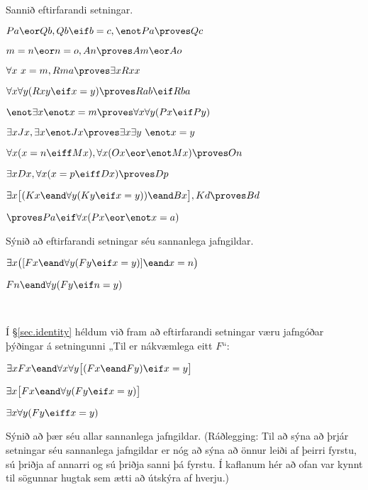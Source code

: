 \practiceproblems
\problempart
\label{pr.identity}
Sannið eftirfarandi setningar.
\begin{earg}
\item $Pa \eor Qb, Qb \eif b=c, \enot Pa \proves Qc$
\item $m=n \eor n=o, An \proves Am \eor Ao$
\item $\forall x\ x=m, Rma\proves \exists x Rxx$
\item $\forall x\forall y(Rxy \eif x=y)\proves Rab \eif Rba$
\item $\enot \exists x\enot x = m \proves \forall x\forall y (Px \eif Py)$
\item $\exists x Jx, \exists x \enot Jx\proves \exists x \exists y\ \enot x = y$
\item $\forall x(x=n \eiff Mx), \forall x(Ox \eor \enot Mx)\proves On$
\item $\exists x Dx, \forall x(x=p \eiff Dx)\proves Dp$
\item $\exists x\bigl[(Kx \eand \forall y(Ky \eif x=y)) \eand Bx\bigr], Kd\proves Bd$
\item $\proves Pa \eif \forall x(Px \eor \enot x = a)$
\end{earg}

\problempart
Sýnið að eftirfarandi setningar séu sannanlega jafngildar.
\begin{ebullet}
\item $\exists x \bigl([Fx \eand \forall y (Fy \eif x = y)] \eand x = n\bigr)$
\item $Fn \eand \forall y (Fy \eif n= y)$
\end{ebullet}

\

\problempart
Í \S\ref{sec.identity} héldum við fram að eftirfarandi setningar væru jafngóðar þýðingar á setningunni „Til er nákvæmlega eitt $F$“:
\begin{ebullet}
\item $\exists x Fx \eand \forall x \forall y \bigl[(Fx \eand Fy) \eif x = y\bigr]$
\item $\exists x \bigl[Fx \eand \forall y (Fy \eif x = y)\bigr]$
\item $\exists x \forall y (Fy \eiff x = y)$
\end{ebullet}
Sýnið að þær séu allar sannanlega jafngildar. (Ráðlegging: Til að sýna að þrjár setningar séu sannanlega jafngildar er nóg að sýna að önnur leiði af þeirri fyrstu, sú þriðja af annarri og sú þriðja sanni þá fyrstu. Í kaflanum hér að ofan var kynnt til sögunnar hugtak sem ætti að útskýra af hverju.)

